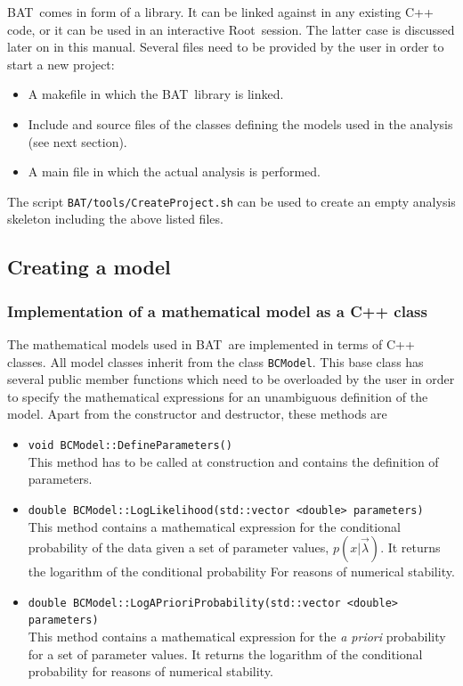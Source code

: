 \documentclass[11pt, a4paper]{article}
\newcommand{\bat}{{\sc BAT}}
\newcommand{\Root}{{\sc Root}}
\begin{document}
\bat\ comes in form of a library. It can be linked against in any
existing C++ code, or it can be used in an interactive
\Root\ session. The latter case is discussed later on in this
manual. Several files need to be provided by the user in order to
start a new project:
% 
\begin{itemize}
\item A makefile in which the \bat\ library is linked. 
\item Include and source files of the classes defining the models
used in the analysis (see next section). 
\item A main file in which the actual analysis is performed. 
\end{itemize} 
%
The script \verb|BAT/tools/CreateProject.sh| can be used to create an
empty analysis skeleton including the above listed files.


\subsection{Creating a model} 
\label{subsection:model}


\subsubsection{Implementation of a mathematical model as a C++ class} 
\label{subsubsection:implementation}

The mathematical models used in \bat\ are implemented in terms of C++
classes. All model classes inherit from the class \verb|BCModel|. This
base class has several public member functions which need to be
overloaded by the user in order to specify the mathematical
expressions for an unambiguous definition of the model. Apart from the
constructor and destructor, these methods are
% 
\begin{itemize}
\item \verb|void BCModel::DefineParameters()| \\
This method has to be called at construction and contains the
definition of parameters.
% 
\item
  \verb|double BCModel::LogLikelihood(std::vector <double> parameters)|
  \\ This method contains a mathematical expression for the
  conditional probability of the data given a set of parameter values,
  $p(x|\vec{\lambda})$. It returns the logarithm of the conditional
  probability For reasons of numerical stability. 
%
\item
  \verb|double BCModel::LogAPrioriProbability(std::vector <double> parameters)|
  \\ This method contains a mathematical expression for the {\it a
    priori} probability for a set of parameter values. It returns the
  logarithm of the conditional probability for reasons of numerical
  stability.
\end{itemize} 
\end{document}
